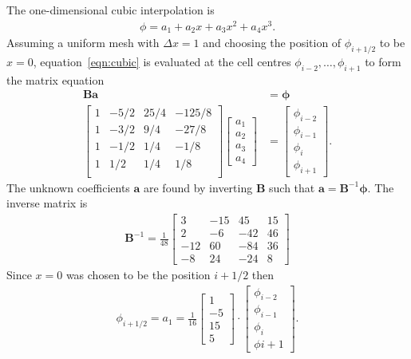 \documentclass{article}
\begin{document}
The one-dimensional cubic interpolation is
\begin{align}
	\phi = a_1 + a_2 x + a_3 x^2 + a_4 x^3 \text{.} \label{eqn:cubic}
\end{align}
Assuming a uniform mesh with $\Delta x = 1$ and choosing the position of $\phi_{i+1/2}$ to be $x=0$, equation~\eqref{eqn:cubic} is evaluated at the cell centres $\phi_{i-2}, \ldots, \phi_{i+1}$ to form the matrix equation
\begin{align}
	\mathbf{B} \mathbf{a} &= \bm{\phi} \\
	\begin{bmatrix}
		1 & -5/2 & 25/4 & -125/8 \\
		1 & -3/2 &  9/4 & -27/8 \\
		1 & -1/2 &  1/4 &  -1/8 \\
		1 &  1/2 &  1/4 &   1/8 \\
	\end{bmatrix}
	\begin{bmatrix}
		a_1 \\
		a_2 \\
		a_3 \\
		a_4
	\end{bmatrix}
	&=
	\begin{bmatrix}
		\phi_{i-2} \\
		\phi_{i-1} \\
		\phi_i \\
		\phi_{i+1}
	\end{bmatrix} \text{.}
\end{align}
The unknown coefficients $\mathbf{a}$ are found by inverting $\mathbf{B}$ such that $\mathbf{a} = \mathbf{B}^{-1} \bm{\phi}$.  The inverse matrix is
\begin{align}
	\mathbf{B}^{-1} = 
	\frac{1}{48}
	\begin{bmatrix}
		3 & -15 & 45 & 15 \\
		2 & -6 & -42 & 46 \\
		-12 & 60 & -84 & 36 \\
		-8 & 24 & -24 & 8
	\end{bmatrix} \label{eqn:cubicfit-inverse}
\end{align}
Since $x=0$ was chosen to be the position $i+1/2$ then 
\begin{align}
	\phi_{i+1/2} = a_1 = 
	\frac{1}{16}
	\begin{bmatrix}
		1 \\ -5 \\ 15 \\ 5
	\end{bmatrix}
	\cdot
	\begin{bmatrix}
		\phi_{i-2} \\
		\phi_{i-1} \\
		\phi_i \\
		\phi{i+1}
	\end{bmatrix} \text{.} \label{eqn:cubicfit-fluxcoeffs}
\end{align}
\end{document}
